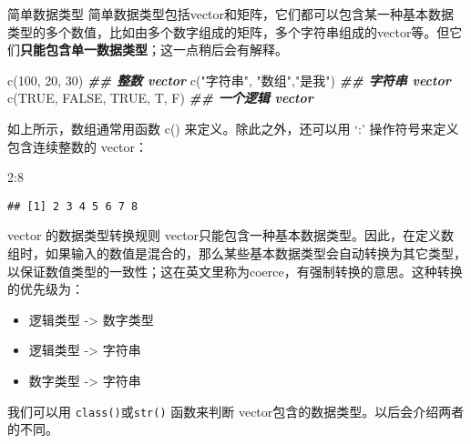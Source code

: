\documentclass[ignorenonframetext,]{beamer}
\newenvironment{Shaded}{\begin{snugshade}}{\end{snugshade}}
\newcommand{\ConstantTok}[1]{\textcolor[rgb]{0.00,0.00,0.00}{#1}}
\newcommand{\DecValTok}[1]{\textcolor[rgb]{0.00,0.00,0.81}{#1}}
\newcommand{\DocumentationTok}[1]{\textcolor[rgb]{0.56,0.35,0.01}{\textbf{\textit{#1}}}}
\newcommand{\FunctionTok}[1]{\textcolor[rgb]{0.00,0.00,0.00}{#1}}
\newcommand{\NormalTok}[1]{#1}
\newcommand{\SpecialCharTok}[1]{\textcolor[rgb]{0.00,0.00,0.00}{#1}}
\newcommand{\StringTok}[1]{\textcolor[rgb]{0.31,0.60,0.02}{#1}}
\providecommand{\tightlist}{%
  \setlength{\itemsep}{0pt}\setlength{\parskip}{0pt}}
\newcommand\FontSmall{\fontsize{7}{8}\selectfont}
\newcommand\FontNormal{\fontsize{10}{10}\selectfont}
\begin{document}
\begin{frame}[fragile]{简单数据类型}
\protect\hypertarget{ux7b80ux5355ux6570ux636eux7c7bux578b}{}
简单数据类型包括vector和矩阵，它们都可以包含某一种基本数据类型的多个数值，比如由多个数字组成的矩阵，多个字符串组成的vector等。但它们\textbf{只能包含单一数据类型}；这一点稍后会有解释。

\FontSmall

\begin{Shaded}
\begin{Highlighting}[]
\FunctionTok{c}\NormalTok{(}\DecValTok{100}\NormalTok{, }\DecValTok{20}\NormalTok{, }\DecValTok{30}\NormalTok{) }\DocumentationTok{\#\# 整数 vector }
\FunctionTok{c}\NormalTok{(}\StringTok{"字符串"}\NormalTok{, }\StringTok{"数组"}\NormalTok{,}\StringTok{"是我"}\NormalTok{) }\DocumentationTok{\#\# 字符串 vector}
\FunctionTok{c}\NormalTok{(}\ConstantTok{TRUE}\NormalTok{, }\ConstantTok{FALSE}\NormalTok{, }\ConstantTok{TRUE}\NormalTok{, T, F) }\DocumentationTok{\#\# 一个逻辑 vector}
\end{Highlighting}
\end{Shaded}

\FontNormal

如上所示，数组通常用函数 c() 来定义。除此之外，还可以用 `:'
操作符号来定义包含连续整数的 vector：

\FontSmall

\begin{Shaded}
\begin{Highlighting}[]
\DecValTok{2}\SpecialCharTok{:}\DecValTok{8}
\end{Highlighting}
\end{Shaded}

\begin{verbatim}
## [1] 2 3 4 5 6 7 8
\end{verbatim}
\end{frame}

\begin{frame}[fragile]{vector 的数据类型转换规则}
\protect\hypertarget{vector-ux7684ux6570ux636eux7c7bux578bux8f6cux6362ux89c4ux5219}{}
vector只能包含一种基本数据类型。因此，在定义数组时，如果输入的数值是混合的，那么某些基本数据类型会自动转换为其它类型，以保证数值类型的一致性；这在英文里称为coerce，有强制转换的意思。这种转换的优先级为：

\begin{itemize}
\tightlist
\item
  逻辑类型 -\textgreater{} 数字类型
\item
  逻辑类型 -\textgreater{} 字符串
\item
  数字类型 -\textgreater{} 字符串
\end{itemize}

我们可以用 \texttt{class()}或\texttt{str()} 函数来判断
vector包含的数据类型。以后会介绍两者的不同。
\end{frame}
\end{document}
